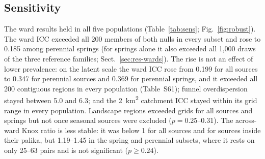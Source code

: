 \documentclass[preprint,12pt,authoryear]{elsarticle}
\begin{document}
\subsection{Sensitivity}\label{sec:res-sens}
The ward results held in all five populations (Table~\ref{tab:sens}; Fig.~\ref{fig:robust}). The ward ICC exceeded all 200 members of both nulls in every subset and rose to 0.185 among perennial springs (for springs alone it also exceeded all 1,000 draws of the three reference families; Sect.~\ref{sec:res-wards}). The rise is not an effect of lower prevalence: on the latent scale the ward ICC rose from 0.199 for all sources to 0.347 for perennial sources and 0.369 for perennial springs, and it exceeded all 200 contiguous regions in every population (Table~S61); funnel overdispersion stayed between 5.0 and 6.3; and the \SI{2}{\kilo\metre\squared} catchment ICC stayed within its grid range in every population. Landscape regions exceeded grids for all sources and springs but not once seasonal sources were excluded ($p = 0.25$--0.31). The across-ward Knox ratio is less stable: it was below 1 for all sources and for sources inside their palika, but 1.19--1.45 in the spring and perennial subsets, where it rests on only 25--63 pairs and is not significant ($p \geq 0.24$).
\end{document}
